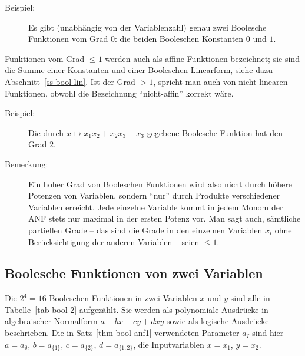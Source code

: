 \begin{refsegment}
\begin{description}
   \item[Beispiel:] Es gibt (unabhängig von der Variablenzahl) genau
      zwei Boolesche Funktionen vom Grad $0$: die beiden Booleschen
      Konstanten $0$ und $1$.
\end{description}
Funktionen vom Grad $\leq 1$ werden auch als affine
Funktionen bezeichnet; sie sind die Summe einer
Konstanten und einer
Booleschen Linearform, siehe dazu Abschnitt~\ref{ss-bool-lin}.
Ist der Grad $> 1$, spricht man auch von nicht-linearen
Funktionen,
obwohl die Bezeichnung "`nicht-affin"' korrekt wäre.
\begin{description}
   \item[Beispiel:] Die durch $x \mapsto x_1 x_2 + x_2 x_3 + x_3$
      gegebene Boolesche Funktion hat den Grad $2$.
   \item[Bemerkung:] Ein hoher Grad von Booleschen Funktionen wird also
      nicht durch höhere Potenzen von Variablen, sondern "`nur"' durch
      Produkte verschiedener Variablen erreicht. Jede einzelne
      Variable kommt in jedem Monom der ANF stets nur maximal in der
      ersten Potenz vor. Man sagt auch, sämtliche partiellen
      Grade --
      das sind die Grade in den einzelnen Variablen $x_i$ ohne
      Berücksichtigung der anderen Variablen -- seien $\leq 1$.
\end{description}

\subsection{Boolesche Funktionen von zwei Variablen}\label{ss-bool-2}

Die $2^4 = 16$ Booleschen Funktionen in zwei Variablen $x$ und $y$
sind alle in Tabelle~\ref{tab-bool-2} aufgezählt. Sie werden
als polynomiale Ausdrücke in algebraischer Normalform $a + bx + cy + dxy$
sowie als logische Ausdrücke beschrieben. Die in Satz~\ref{thm-bool-anf1}
verwendeten Parameter $a_I$ sind hier
$a = a_{\emptyset}$, $ b = a_{\{1\}}$, $c = a_{\{2\}}$, $ d = a_{\{1,2\}}$,
die Inputvariablen $x = x_1$, $y = x_2$.


\end{refsegment}
